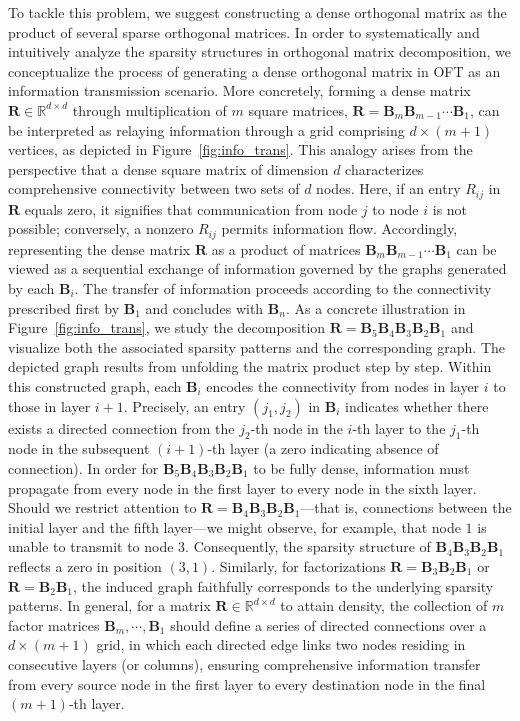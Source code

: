 To tackle this problem, we suggest constructing a dense orthogonal matrix as the product of several sparse orthogonal matrices. In order to systematically and intuitively analyze the sparsity structures in orthogonal matrix decomposition, we conceptualize the process of generating a dense orthogonal matrix in OFT as an information transmission scenario. More concretely, forming a dense matrix $\bm{R}\in\mathbb{R}^{d\times d}$ through multiplication of $m$ square matrices, $\bm{R}=\bm{B}_m\bm{B}_{m-1}\cdots\bm{B}_1$, can be interpreted as relaying information through a grid comprising $d\times (m+1)$ vertices, as depicted in Figure~\ref{fig:info_trans}. This analogy arises from the perspective that a dense square matrix of dimension $d$ characterizes comprehensive connectivity between two sets of $d$ nodes. Here, if an entry $R_{ij}$ in $\bm{R}$ equals zero, it signifies that communication from node $j$ to node $i$ is not possible; conversely, a nonzero $R_{ij}$ permits information flow. Accordingly, representing the dense matrix $\bm{R}$ as a product of matrices $\bm{B}_m\bm{B}_{m-1}\cdots\bm{B}_1$ can be viewed as a sequential exchange of information governed by the graphs generated by each $\bm{B}_i$. The transfer of information proceeds according to the connectivity prescribed first by $\bm{B}_1$ and concludes with $\bm{B}_n$. As a concrete illustration in Figure~\ref{fig:info_trans}, we study the decomposition $\bm{R}=\bm{B}_5\bm{B}_4\bm{B}_3\bm{B}_2\bm{B}_1$ and visualize both the associated sparsity patterns and the corresponding graph. The depicted graph results from unfolding the matrix product step by step. Within this constructed graph, each $\bm{B}_i$ encodes the connectivity from nodes in layer $i$ to those in layer $i+1$. Precisely, an entry $(j_1,j_2)$ in $\bm{B}_i$ indicates whether there exists a directed connection from the $j_2$-th node in the $i$-th layer to the $j_1$-th node in the subsequent $(i+1)$-th layer (a zero indicating absence of connection). In order for $\bm{B}_5\bm{B}_4\bm{B}_3\bm{B}_2\bm{B}_1$ to be fully dense, information must propagate from every node in the first layer to every node in the sixth layer. Should we restrict attention to $\bm{R}=\bm{B}_4\bm{B}_3\bm{B}_2\bm{B}_1$—that is, connections between the initial layer and the fifth layer—we might observe, for example, that node $1$ is unable to transmit to node $3$. Consequently, the sparsity structure of $\bm{B}_4\bm{B}_3\bm{B}_2\bm{B}_1$ reflects a zero in position $(3,1)$. Similarly, for factorizations $\bm{R}=\bm{B}_3\bm{B}_2\bm{B}_1$ or $\bm{R}=\bm{B}_2\bm{B}_1$, the induced graph faithfully corresponds to the underlying sparsity patterns. In general, for a matrix $\bm{R}\in\mathbb{R}^{d\times d}$ to attain density, the collection of $m$ factor matrices $\bm{B}_m,\cdots,\bm{B}_1$ should define a series of directed connections over a $d\times (m+1)$ grid, in which each directed edge links two nodes residing in consecutive layers (or columns), ensuring comprehensive information transfer from every source node in the first layer to every destination node in the final $(m+1)$-th layer.

